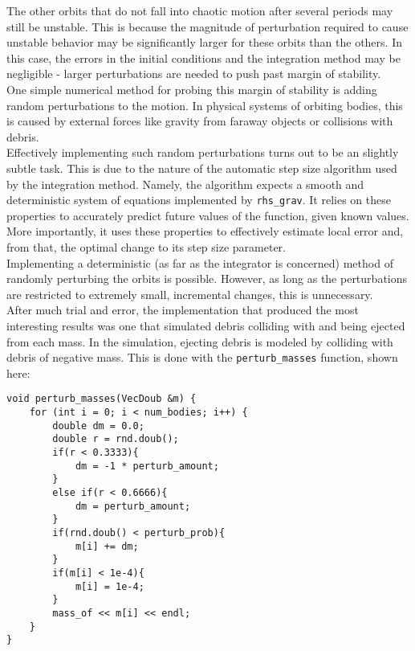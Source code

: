 \documentclass[12pt]{article}
\begin{document}
The other orbits that do not fall into chaotic motion after several periods may still be unstable. This is because the magnitude of perturbation required to cause unstable behavior may be significantly larger for these orbits than the others. In this case, the errors in the initial conditions and the integration method may be negligible - larger perturbations are needed to push past margin of stability. \\

One simple numerical method for probing this margin of stability is adding random perturbations to the motion. In physical systems of orbiting bodies, this is caused by external forces like gravity from faraway objects or collisions with debris. \\

Effectively implementing such random perturbations turns out to be an slightly subtle task. This is due to the nature of the automatic step size algorithm used by the integration method. Namely, the algorithm expects a smooth and deterministic system of equations implemented by \texttt{rhs\_grav}. It relies on these properties to accurately predict future values of the function, given known values. More importantly, it uses these properties to effectively estimate local error and, from that, the optimal change to its step size parameter. \\

Implementing a deterministic (as far as the integrator is concerned) method of randomly perturbing the orbits is possible. However, as long as the perturbations are restricted to extremely small, incremental changes, this is unnecessary. \\

After much trial and error, the implementation that produced the most interesting results was one that simulated debris colliding with and being ejected from each mass. In the simulation, ejecting debris is modeled by colliding with debris of negative mass. This is done with the \texttt{perturb\_masses} function, shown here:

\begin{lstlisting}
void perturb_masses(VecDoub &m) {
    for (int i = 0; i < num_bodies; i++) {
        double dm = 0.0;
        double r = rnd.doub();
        if(r < 0.3333){
            dm = -1 * perturb_amount;
        }
        else if(r < 0.6666){
            dm = perturb_amount;
        }
        if(rnd.doub() < perturb_prob){
            m[i] += dm;
        }
        if(m[i] < 1e-4){
            m[i] = 1e-4;
        }
        mass_of << m[i] << endl;
    }
}
\end{lstlisting}
\end{document}
